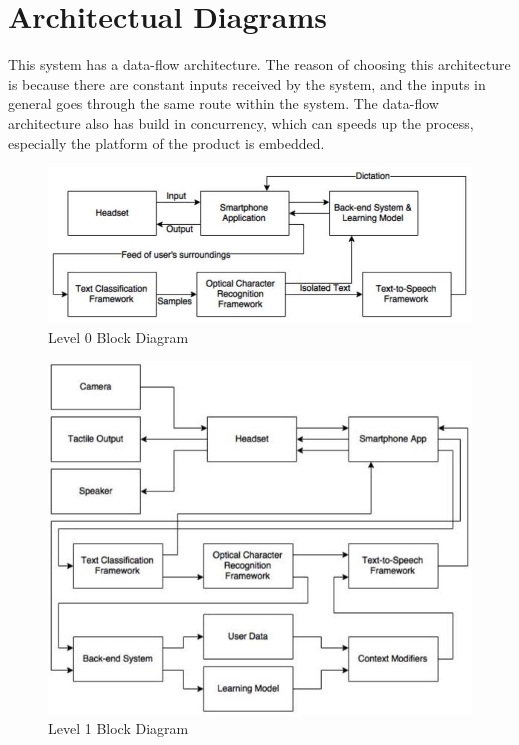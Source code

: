 \chapter{Architectual Diagrams}
This system has a data-flow architecture. The reason of choosing this architecture is because there are constant inputs received by the system, and the inputs in general goes through the same route within the system. The data-flow architecture also has build in concurrency, which can speeds up the process, especially the platform of the product is embedded.
\begin{figure}
	\label{fig:level0}
	\centering
    \includegraphics[scale = 0.5]{level0.jpg}
    
    \caption{Level 0 Block Diagram}
\end{figure}
\begin{figure}
	\label{fig:level1}
	\centering
    \includegraphics[scale = 0.6]{level1.jpg}
    
    \caption{Level 1 Block Diagram}
\end{figure}